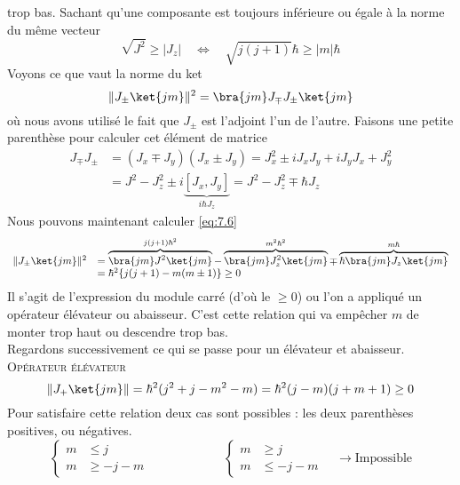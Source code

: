trop bas. Sachant qu'une composante est toujours inférieure ou égale à la norme du 
même vecteur
\begin{equation}
\sqrt{J^2} \geq |J_z|\quad\Leftrightarrow\quad \sqrt{j(j+1)}\hbar \geq |m|\hbar
\end{equation}
Voyons ce que vaut la norme du ket
\begin{equation}
\|J_\pm\ket{jm}\|^2 = \bra{jm}J_\mp J_\pm\ket{jm}
\label{eq:7.6}
\end{equation}
où nous avons utilisé le fait que $J_\pm$ est l'adjoint l'un de l'autre. Faisons 
une petite parenthèse pour calculer cet élément de matrice
\begin{equation}
\begin{array}{ll}
J_\mp J_\pm &= (J_x\mp J_y)(J_x\pm J_y) = J_x^2\pm iJ_xJ_y+iJ_yJ_x+J_y^2\\
&=J^2-J_z^2 \pm i\underbrace{[J_x,J_y]}_{i\hbar J_z} = J^2-J_z^2 \mp \hbar J_z
\end{array}
\end{equation}
Nous pouvons maintenant calculer \eqref{eq:7.6}
\begin{equation}
\begin{array}{ll}
\|J_\pm\ket{jm}\|^2 &=  \overbrace{\bra{jm}J^2\ket{jm}}^{j(j+1)\hbar^2} - \overbrace{\bra{jm}J_z^2\ket{jm}}^{
m^2\hbar^2}\mp\overbrace{\hbar \bra{jm}J_z\ket{jm}}^{m\hbar}\\
&= \hbar^2\{j(j+1)-m(m\pm 1)\} \geq 0
\end{array}
\end{equation}
Il s'agit de l'expression du module carré (d'où le $\geq 0$) ou l'on a appliqué un opérateur élévateur 
ou abaisseur. C'est cette relation qui va empêcher $m$ de monter trop haut ou descendre trop bas.\\

Regardons successivement ce qui se passe pour un élévateur et abaisseur.\\
	\textsc{Opérateur élévateur}
	\begin{equation}
	\|J_+\ket{jm}\| = \hbar^2(j^2+j-m^2-m) = \hbar^2(j-m)(j+m+1)\geq 0
	\end{equation}
	Pour satisfaire cette relation deux cas sont possibles : les deux parenthèses positives, ou négatives.
	\begin{equation}
	\left\{\begin{array}{ll}
	m &\leq j\\
	m &\geq -j-m
	\end{array}\right.\qquad\qquad\qquad	\left\{\begin{array}{ll}
	m &\geq j\\
	m &\leq -j-m
	\end{array}\right.\quad\rightarrow \text{Impossible}
	\end{equation}
	
